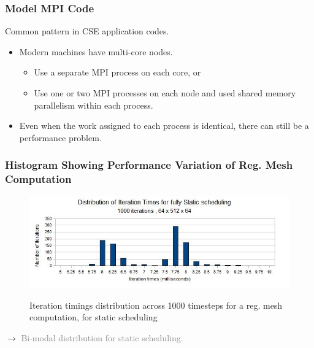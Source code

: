 \begin{frame}[label=modelMPICode]
  \frametitle{Model MPI Code} 
 Common pattern in CSE application codes.\\
  \vspace*{0.1in}
%
 
\begin{itemize}
\small \item \small Modern machines have multi-core nodes.
\begin{itemize}
\item \small Use a separate MPI process on each core, or 
\item \small Use one or two MPI processes on each node and used shared
  memory parallelism within each process.
\end{itemize}
\item \small Even when the work assigned to each process is identical, there can still be a performance problem.
\end{itemize} 
\end{frame}

\begin{frame}   
\frametitle{Histogram Showing Performance Variation of Reg. Mesh Computation}
\begin{figure}
\begin{center}                     
\includegraphics[scale=0.24]{plots/IterTimingsHisto-static}\\ 
\end{center}    
{\small Iteration timings distribution across 1000 timesteps for a reg. mesh computation, for static scheduling } 
\end{figure} 
\begin{center} 
{\small $\rightarrow$ \textcolor{gray}{Bi-modal distribution for static scheduling.}  } 
\end{center} 
\end{frame}                                     

